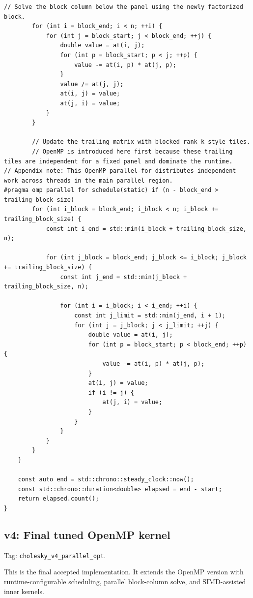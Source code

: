 \begin{lstlisting}[style=appendixcode]
        // Solve the block column below the panel using the newly factorized block.
        for (int i = block_end; i < n; ++i) {
            for (int j = block_start; j < block_end; ++j) {
                double value = at(i, j);
                for (int p = block_start; p < j; ++p) {
                    value -= at(i, p) * at(j, p);
                }
                value /= at(j, j);
                at(i, j) = value;
                at(j, i) = value;
            }
        }

        // Update the trailing matrix with blocked rank-k style tiles.
        // OpenMP is introduced here first because these trailing tiles are independent for a fixed panel and dominate the runtime.
// Appendix note: This OpenMP parallel-for distributes independent work across threads in the main parallel region.
#pragma omp parallel for schedule(static) if (n - block_end > trailing_block_size)
        for (int i_block = block_end; i_block < n; i_block += trailing_block_size) {
            const int i_end = std::min(i_block + trailing_block_size, n);

            for (int j_block = block_end; j_block <= i_block; j_block += trailing_block_size) {
                const int j_end = std::min(j_block + trailing_block_size, n);

                for (int i = i_block; i < i_end; ++i) {
                    const int j_limit = std::min(j_end, i + 1);
                    for (int j = j_block; j < j_limit; ++j) {
                        double value = at(i, j);
                        for (int p = block_start; p < block_end; ++p) {
                            value -= at(i, p) * at(j, p);
                        }
                        at(i, j) = value;
                        if (i != j) {
                            at(j, i) = value;
                        }
                    }
                }
            }
        }
    }

    const auto end = std::chrono::steady_clock::now();
    const std::chrono::duration<double> elapsed = end - start;
    return elapsed.count();
}
\end{lstlisting}

\subsection{v4: Final tuned OpenMP kernel}

Tag: \texttt{cholesky\_v4\_parallel\_opt}.

This is the final accepted implementation. It extends the OpenMP version with runtime-configurable scheduling, parallel block-column solve, and SIMD-assisted inner kernels.

